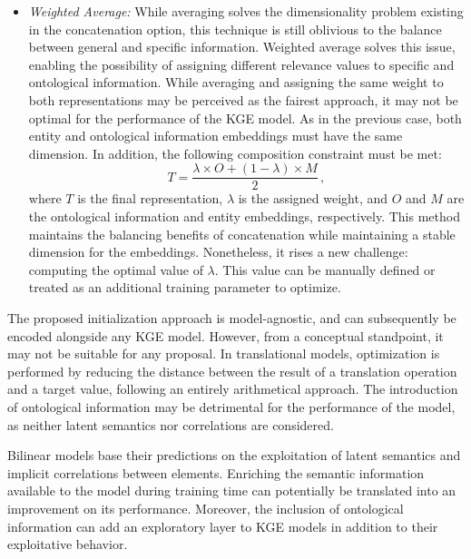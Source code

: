 \begin{itemize}
    \item \textit{Weighted Average:} While averaging solves the dimensionality problem existing in the concatenation option, this technique is still oblivious to the balance between general and specific information. Weighted average solves this issue, enabling the possibility of assigning different relevance values to specific and ontological information. While averaging and assigning the same weight to both representations may be perceived as the fairest approach, it may not be optimal for the performance of the KGE model. As in the previous case, both entity and ontological information embeddings must have the same dimension. In addition, the following composition constraint must be met:
    \begin{equation}
        T = \frac{\lambda \times O + (1 - \lambda) \times M}{2}\,,
    \end{equation}
    where $T$ is the final representation, $\lambda$ is the assigned weight, and $O$ and $M$ are the ontological information and entity embeddings, respectively. This method maintains the balancing benefits of concatenation while maintaining a stable dimension for the embeddings. Nonetheless, it rises a new challenge: computing the optimal value of $\lambda$. This value can be manually defined or treated as an additional training parameter to optimize.
\end{itemize}

The proposed initialization approach is model-agnostic, and can subsequently be encoded alongside any KGE model. However, from a conceptual standpoint, it may not be suitable for any proposal. In translational models, optimization is performed by reducing the distance between the result of a translation operation and a target value, following an entirely arithmetical approach. The introduction of ontological information may be detrimental for the performance of the model, as neither latent semantics nor correlations are considered.

Bilinear models base their predictions on the exploitation of latent semantics and implicit correlations between elements. Enriching the semantic information available to the model during training time can potentially be translated into an improvement on its performance. Moreover, the inclusion of ontological information can add an exploratory layer to KGE models in addition to their exploitative behavior.


